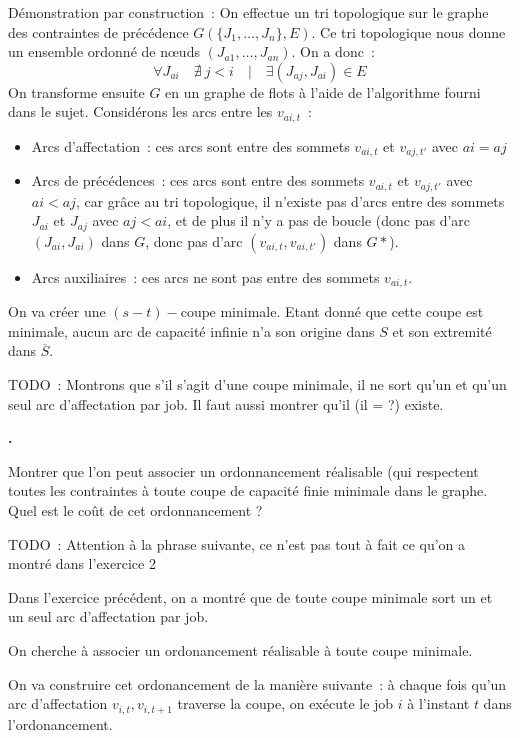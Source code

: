 \documentclass{article}
\newcounter{enoncecount}
\newenvironment{enonce}
{%
\stepcounter{enoncecount}
\bf\small \arabic{enoncecount}.
\begin{bf}
}
{%
\end{bf}
}
\begin{document}
Démonstration par construction~: 
On effectue un tri topologique sur le graphe des contraintes de précédence $G(\{J_1, \dots, J_n\}, E)$. Ce tri topologique nous donne un ensemble ordonné de n\oe uds $(J_{a1}, \dots, J_{an})$. On a donc~:
$$\forall J_{ai} \quad \nexists \ j < i \quad | \quad \exists (J_{aj}, J_{ai}) \in E$$
On transforme ensuite $G$ en un graphe de flots à l'aide de l'algorithme fourni dans le sujet. 
Considérons les arcs entre les $v_{ai,t}$~: 
\begin{itemize}
	\item Arcs d'affectation~: ces arcs sont entre des sommets $v_{ai,t}$ et $v_{aj,t'}$ avec $ai = aj$
	\item Arcs de précédences~: ces arcs sont entre des sommets $v_{ai,t}$ et $v_{aj,t'}$ avec $ai < aj$, car grâce au tri topologique, il n'existe pas d'arcs entre des sommets $J_{ai}$ et $J_{aj}$ avec $aj < ai$, et de plus il n'y a pas de boucle (donc pas d'arc $(J_{ai},J_{ai})$ dans $G$, donc pas d'arc $(v_{ai,t}, v_{ai,t'})$ dans $G*$).
	\item Arcs auxiliaires~: ces arcs ne sont pas entre des sommets $v_{ai,t}$.
\end{itemize}
On va créer une $(s-t)-\mathrm{coupe}$ minimale. Etant donné que cette coupe est minimale, aucun arc de capacité infinie n'a son origine dans $S$ et son extremité dans $\overline{S}$.

TODO~: Montrons que s'il s'agit d'une coupe minimale, il ne sort qu'un et qu'un
seul arc d'affectation par job. Il faut aussi montrer qu'il (il = ?) existe.

\begin{enonce}
Montrer que l'on peut associer un ordonnancement réalisable (qui respectent toutes les contraintes à toute 
coupe de capacité finie minimale dans le graphe. Quel est le coût de cet ordonnancement ? 
\end{enonce}

TODO~: Attention à la phrase suivante, ce n'est pas tout à fait ce qu'on a montré dans l'exercice 2

Dans l'exercice précédent, on a montré que de toute coupe minimale sort un et un seul arc d'affectation par job.

On cherche à associer un ordonancement réalisable à toute coupe minimale.

On va construire cet ordonancement de la manière suivante~: à chaque
fois qu'un arc d'affectation $v_{i,t}, v_{i,t+1}$ traverse la coupe,
on exécute le job $i$ à l'instant $t$ dans l'ordonancement.
\end{document}
